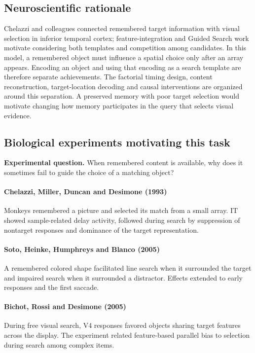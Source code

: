 \documentclass[11pt]{article}
\begin{document}
\subsection{Neuroscientific rationale}
Chelazzi and colleagues connected remembered target information with visual selection in inferior temporal cortex; feature-integration and Guided Search work motivate considering both templates and competition among candidates. In this model, a remembered object must influence a spatial choice only after an array appears. Encoding an object and using that encoding as a search template are therefore separate achievements. The factorial timing design, content reconstruction, target-location decoding and causal interventions are organized around this separation. A preserved memory with poor target selection would motivate changing how memory participates in the query that selects visual evidence.

\subsection{Biological experiments motivating this task}
\textbf{Experimental question.} When remembered content is available, why does it sometimes fail to guide the choice of a matching object?

\paragraph{Chelazzi, Miller, Duncan and Desimone (1993)} Monkeys remembered a picture and selected its match from a small array. IT showed sample-related delay activity, followed during search by suppression of nontarget responses and dominance of the target representation. \cite{bio_chelazzi}

\paragraph{Soto, Heinke, Humphreys and Blanco (2005)} A remembered colored shape facilitated line search when it surrounded the target and impaired search when it surrounded a distractor. Effects extended to early responses and the first saccade. \cite{bio_soto}

\paragraph{Bichot, Rossi and Desimone (2005)} During free visual search, V4 responses favored objects sharing target features across the display. The experiment related feature-based parallel bias to selection during search among complex items. \cite{bio_bichot}
\end{document}
